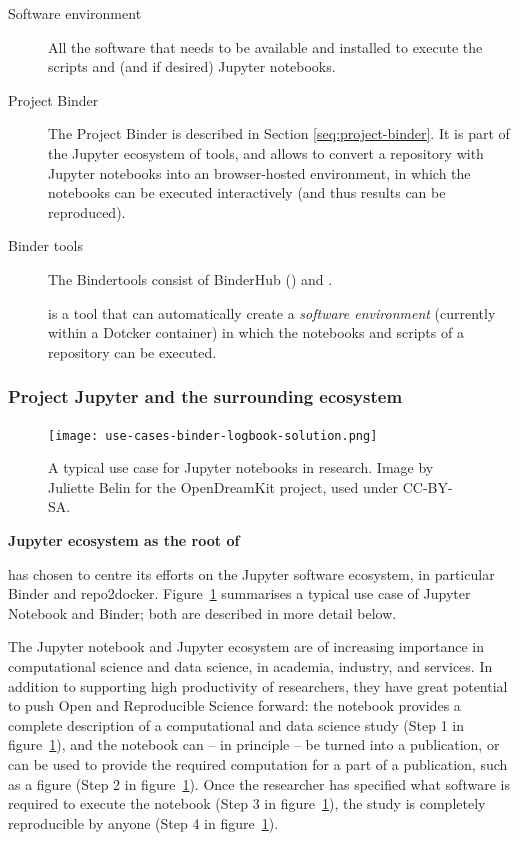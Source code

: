 \begin{description}
\item[Software environment] All the software that needs to be available and
  installed to execute the scripts and (and if desired) Jupyter notebooks.

\item[Project Binder] The Project Binder is described in Section
\ref{seq:project-binder}. It is part of the Jupyter ecosystem of tools, and
allows to convert a repository with Jupyter notebooks into an browser-hosted
environment, in which the notebooks can be executed interactively (and thus
results can be reproduced). 

\item[Binder tools] The Bindertools consist of BinderHub () and
\repotodocker{}. 

\item[\repotodocker] \repotodocker{} is a tool that can automatically create a
\emph{software environment} (currently within a Dotcker container) in which the
notebooks and scripts of a repository can be executed. 
\end{description}




\subsubsection{Project Jupyter and the surrounding ecosystem}
\label{sec:project-jupyter}

\begin{figure}[htb]\centering
  \texttt{[image: use-cases-binder-logbook-solution.png]}
  \caption{A typical use case for Jupyter notebooks in research.
            Image by Juliette Belin for the OpenDreamKit project, used under
            CC-BY-SA.}\label{fig:use-cases-binder}
\end{figure}

\noindent\textbf{Jupyter ecosystem as the root of \TheProject}

\TheProject has chosen to centre its efforts on the Jupyter software
ecosystem, in particular Binder and repo2docker.
Figure~\ref{fig:use-cases-binder} summarises a typical use
case of Jupyter Notebook and Binder;
both are described in more detail below.

The Jupyter notebook and Jupyter ecosystem are of increasing
importance in computational science and data science, in academia,
industry, and services. In addition to supporting high productivity of
researchers, they have great potential to push Open and Reproducible Science forward:
the notebook provides a complete description of a computational and
data science study (Step 1 in figure~\ref{fig:use-cases-binder}), and the notebook can -- in principle -- be turned
into a publication, or can be used to provide the required computation
for a part of a publication, such as a figure
(Step 2 in figure~\ref{fig:use-cases-binder}). Once the researcher has
specified what software is required to execute the notebook (Step 3
in figure~\ref{fig:use-cases-binder}), the study is completely
reproducible by anyone (Step 4 in figure~\ref{fig:use-cases-binder}).

